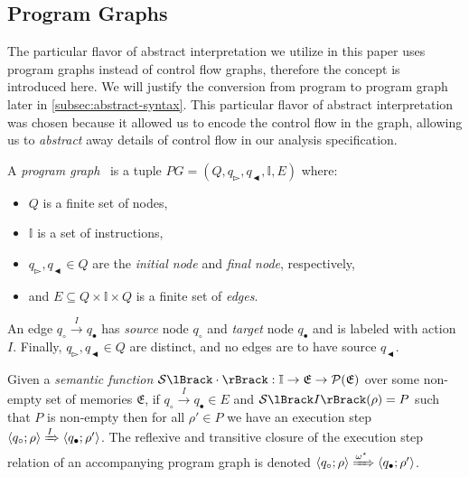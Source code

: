 \subsection{Program Graphs}\label{subsec:program-graphs}

The particular flavor of abstract interpretation we utilize in this paper uses program graphs instead of control flow graphs, therefore the concept is introduced here.
We will justify the conversion from program to program graph later in \autoref{subsec:abstract-syntax}.
This particular flavor of abstract interpretation was chosen because it allowed us to encode the control flow in the graph, allowing us to \emph{abstract} away details of control flow in our analysis specification.

\begin{definition}
    A \emph{program graph}~\cite{nielson_formal_2019} is a tuple $PG = (Q, q_\whitepointerright, q_\blackpointerleft, \mathbb{I}, E)$ where:
    \begin{itemize}
        \item $Q$ is a finite set of nodes,
        \item $\mathbb{I}$ is a set of instructions,
        \item $q_\whitepointerright, q_\blackpointerleft \in Q$ are the \emph{initial node} and \emph{final node}, respectively,
        \item and $E \subseteq Q \times \mathbb{I} \times Q$ is a finite set of \emph{edges}.
    \end{itemize}

    An edge $q_\circ \xrightarrow{I} q_\bullet$ has \emph{source} node $q_\circ$ and \emph{target} node $q_\bullet$ and is labeled with action $I$.
    Finally, $q_\whitepointerright, q_\blackpointerleft \in Q$ are distinct, and no edges are to have source $q_\blackpointerleft$.
\end{definition}

Given a \emph{semantic function} $\sem{\cdot} : \mathbb{I} \rightarrow \mathfrak{E} \rightarrow \mathcal{P}(\mathfrak{E})$ over some non-empty set of memories $\mathfrak{E}$, if $q_\circ \xrightarrow{I} q_\bullet \in E$ and $\sem{I}(\rho) = P$ such that $P$ is non-empty then for all $\rho' \in P$ we have an execution step $\langle q_\circ; \rho \rangle \xRightarrow{I} \langle q_\bullet; \rho' \rangle$.
The reflexive and transitive closure of the execution step relation of an accompanying program graph is denoted $\langle q_\circ; \rho \rangle \xRightarrow{\omega^\star} \langle q_\bullet; \rho' \rangle$.

